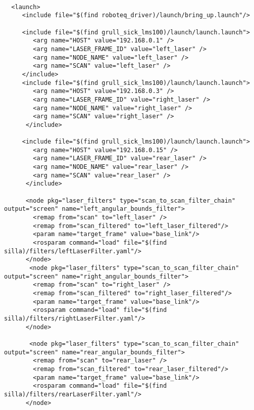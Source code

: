 \begin{center}
\begin{footnotesize}
\begin{verbatim}

  <launch>
     <include file="$(find roboteq_driver)/launch/bring_up.launch"/>
       
     <include file="$(find grull_sick_lms100)/launch/launch.launch">
        <arg name="HOST" value="192.168.0.1" />
        <arg name="LASER_FRAME_ID" value="left_laser" />
        <arg name="NODE_NAME" value="left_laser" />
        <arg name="SCAN" value="left_laser" />
     </include>
     <include file="$(find grull_sick_lms100)/launch/launch.launch">
        <arg name="HOST" value="192.168.0.3" />
        <arg name="LASER_FRAME_ID" value="right_laser" />
        <arg name="NODE_NAME" value="right_laser" />
        <arg name="SCAN" value="right_laser" />
      </include>

     <include file="$(find grull_sick_lms100)/launch/launch.launch">
        <arg name="HOST" value="192.168.0.15" />
        <arg name="LASER_FRAME_ID" value="rear_laser" />
        <arg name="NODE_NAME" value="rear_laser" />
        <arg name="SCAN" value="rear_laser" />
      </include>
      
      <node pkg="laser_filters" type="scan_to_scan_filter_chain" output="screen" name="left_angular_bounds_filter">
        <remap from="scan" to="left_laser" />
        <remap from="scan_filtered" to="left_laser_filtered"/>
        <param name="target_frame" value="base_link"/>
        <rosparam command="load" file="$(find silla)/filters/leftLaserFilter.yaml"/>
      </node>
       <node pkg="laser_filters" type="scan_to_scan_filter_chain" output="screen" name="right_angular_bounds_filter">
        <remap from="scan" to="right_laser" />
        <remap from="scan_filtered" to="right_laser_filtered"/>
        <param name="target_frame" value="base_link"/>
        <rosparam command="load" file="$(find silla)/filters/rightLaserFilter.yaml"/>
      </node>

       <node pkg="laser_filters" type="scan_to_scan_filter_chain" output="screen" name="rear_angular_bounds_filter">
        <remap from="scan" to="rear_laser" />
        <remap from="scan_filtered" to="rear_laser_filtered"/>
        <param name="target_frame" value="base_link"/>
        <rosparam command="load" file="$(find silla)/filters/rearLaserFilter.yaml"/>
      </node>
      


\end{verbatim}
\end{footnotesize}
\end{center}
